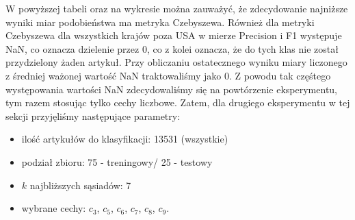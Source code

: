 \documentclass{classrep}
\begin{document}
W powyższej tabeli oraz na wykresie można zauważyć, że zdecydowanie najniższe wyniki miar podobieństwa ma metryka Czebyszewa. Również dla metryki Czebyszewa dla wszystkich krajów poza USA w mierze Precision i F1 występuje NaN, co oznacza dzielenie przez 0, co z kolei oznacza, że do tych klas nie został przydzielony żaden artykuł. Przy obliczaniu ostatecznego wyniku miary liczonego z średniej ważonej wartość NaN traktowaliśmy jako 0. Z powodu tak częśtego występowania wartości NaN zdecydowaliśmy się na powtórzenie eksperymentu, tym razem stosując tylko cechy liczbowe.
Zatem, dla drugiego eksperymentu w tej sekcji przyjęliśmy następujące parametry:
\begin{itemize}
    \item ilość artykułów do klasyfikacji: 13531 (wszystkie)
    \item podział zbioru: 75 - treningowy/ 25 - testowy
    \item $k$ najbliższych sąsiadów: 7
    \item wybrane cechy: $c_3$, $c_5$, $c_6$, $c_7$, $c_8$, $c_9$.
\end{itemize}

\end{document}
